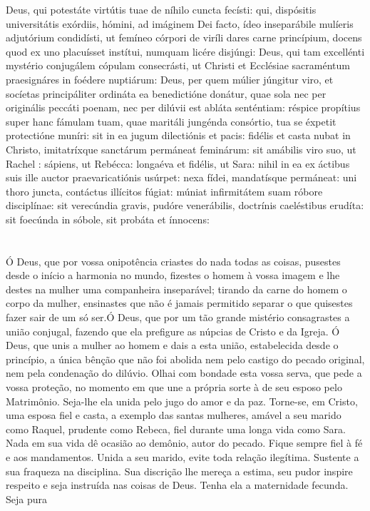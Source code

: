 \newpage
\begin{multicols}{2}
	\noindent Deus, qui potestáte virtútis tuae de níhilo cuncta fecísti: qui, dispósitis universitátis exórdiis, hómini, ad imáginem Dei facto, ídeo inseparábile mulíeris adjutórium condidísti, ut femíneo córpori de viríli dares carne princípium, docens quod ex uno placuísset instítui, numquam licére disjúngi: Deus, qui tam excellénti mystério conjugálem cópulam consecrásti, ut Christi et Ecclésiae sacraméntum praesignáres in foédere nuptiárum: Deus, per quem múlier júngitur viro, et socíetas principáliter ordináta ea benedictióne donátur, quae sola nec per originális peccáti poenam, nec per dilúvii est abláta senténtiam: réspice propítius super hanc fámulam tuam, quae maritáli jungénda consórtio, tua se éxpetit protectióne muníri: sit in ea jugum dilectiónis et pacis: fidélis et casta nubat in Christo, imitatríxque sanctárum permáneat feminárum: sit amábilis viro suo, ut Rachel : sápiens, ut Rebécca: longaéva et fidélis, ut Sara: nihil in ea ex áctibus suis ille auctor praevaricatiónis usúrpet: nexa fídei, mandatísque permáneat: uni thoro juncta, contáctus illícitos fúgiat: múniat infirmitátem suam róbore disciplínae: sit verecúndia gravis, pudóre venerábilis, doctrínis caeléstibus erudíta: sit foecúnda in sóbole, sit probáta et ínnocens: 
	\\
	\\
	\\ Ó Deus, que por vossa onipotência criastes do nada todas as coisas, pusestes desde o início a harmonia no mundo, fizestes o homem à vossa imagem e lhe destes na mulher uma companheira inseparável; tirando da carne do homem o corpo da mulher, ensinastes que não é jamais permitido separar o que quisestes fazer sair de um só ser.Ó Deus, que por um tão grande mistério consagrastes a união conjugal, fazendo que ela prefigure as núpcias de Cristo e da Igreja. Ó Deus, que unis a mulher ao homem e dais a esta união, estabelecida desde o princípio, a única bênção que não foi abolida nem pelo castigo do pecado original, nem pela condenação do dilúvio. Olhai com bondade esta vossa serva, que pede a vossa proteção, no momento em que une a própria sorte à de seu esposo pelo Matrimônio. Seja-lhe ela unida pelo jugo do amor e da paz. Torne-se, em Cristo, uma esposa fiel e casta, a exemplo das santas mulheres, amável a seu marido como Raquel, prudente como Rebeca, fiel durante uma longa vida como Sara. Nada em sua vida dê ocasião ao demônio, autor do pecado. Fique sempre fiel à fé e aos mandamentos. Unida a seu marido, evite toda relação ilegítima. Sustente a sua fraqueza na disciplina. Sua discrição lhe mereça a estima, seu pudor inspire respeito e seja instruída nas coisas de Deus. Tenha ela a maternidade fecunda. Seja pura
\end{multicols}

